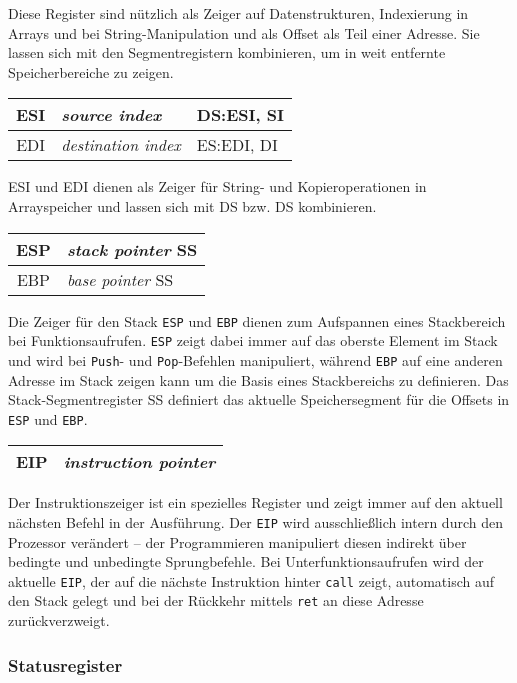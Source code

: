 Diese Register sind nützlich als Zeiger auf Datenstrukturen, Indexierung in Arrays und bei String-Manipulation und als Offset als Teil einer Adresse. Sie lassen sich mit den Segmentregistern kombinieren, um in weit entfernte Speicherbereiche zu zeigen.

\begin{tabular}{|c|l|l|}
\hline ESI & \emph{source index} & DS:ESI, SI\\
\hline EDI & \emph{destination index} & ES:EDI, DI\\
\hline
\end{tabular}

ESI und EDI dienen als Zeiger für String- und Kopieroperationen in Arrayspeicher und lassen sich mit DS bzw. DS kombinieren.

\begin{tabular}{|c|l|}
\hline ESP & \emph{stack pointer} SS\\
\hline EBP & \emph{base pointer} SS\\
\hline
\end{tabular}

Die Zeiger für den Stack {\tt ESP} und {\tt EBP} dienen zum Aufspannen eines Stackbereich bei Funktionsaufrufen. {\tt ESP} zeigt dabei immer auf das oberste Element im Stack und wird bei {\tt Push}- und {\tt Pop}-Befehlen manipuliert, während {\tt EBP} auf eine anderen Adresse im Stack zeigen kann um die Basis eines Stackbereichs zu definieren. Das Stack-Segmentregister SS definiert das aktuelle Speichersegment für die Offsets in {\tt ESP} und {\tt EBP}.

\begin{tabular}{|c|l|}
\hline EIP & \emph{instruction pointer} \\
\hline
\end{tabular}

Der Instruktionszeiger ist ein spezielles Register und zeigt immer auf den aktuell nächsten Befehl in der Ausführung. Der {\tt EIP} wird ausschließlich intern durch den Prozessor verändert – der Programmieren manipuliert diesen indirekt über bedingte und unbedingte Sprungbefehle. Bei Unterfunktionsaufrufen wird der aktuelle {\tt EIP}, der  auf die nächste Instruktion hinter {\tt call} zeigt, automatisch auf den Stack gelegt und bei der Rückkehr mittels {\tt ret} an diese Adresse zurückverzweigt.

\subsubsection{Statusregister}

